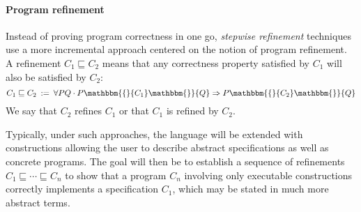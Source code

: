 \documentclass[sigplan,screen]{acmart}
\newcommand{\htr}[3]{{ {#1} \mathbbm{\{} {#2} \mathbbm{\}} {#3} }}
\begin{document}
%
%

\paragraph{Program refinement} %

Instead of proving program correctness in one go,
\emph{stepwise refinement} techniques use a more incremental approach
centered on the notion of program refinement.
A refinement $C_1 \sqsubseteq C_2$
means that any correctness property satisfied by $C_1$
will also be satisfied by $C_2$:
\[
    C_1 \sqsubseteq C_2 \: := \:
    \forall P Q \cdot
      \htr{P}{C_1}{Q} \Rightarrow
      \htr{P}{C_2}{Q}
\]
We say that $C_2$ refines $C_1$
or that $C_1$ is refined by $C_2$.

Typically,
under such approaches,
the language will be extended with constructions
allowing the user to describe
abstract specifications as well as
concrete programs.
The goal will then be to establish
a sequence of refinements
$C_1 \sqsubseteq \cdots \sqsubseteq C_n$
to show that a program $C_n$ involving
only executable constructions
correctly implements a specification $C_1$,
which may be stated in much more abstract terms.
\end{document}
